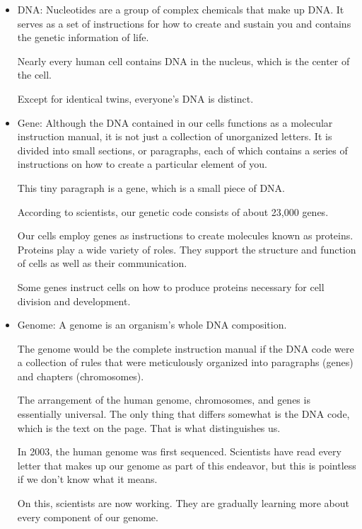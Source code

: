 \documentclass{article}
\begin{document}
\begin{itemize}
    \item DNA: Nucleotides are a group of complex chemicals that make up DNA. It serves as a set of instructions for how to create and sustain you and contains the genetic information of life. 

    Nearly every human cell contains DNA in the nucleus, which is the center of the cell. 
    
    Except for identical twins, everyone's DNA is distinct.
    \item  Gene: Although the DNA contained in our cells functions as a molecular instruction manual, it is not just a collection of unorganized letters. It is divided into small sections, or paragraphs, each of which contains a series of instructions on how to create a particular element of you. 

    This tiny paragraph is a gene, which is a small piece of DNA. 
    
    According to scientists, our genetic code consists of about 23,000 genes. 
    
    Our cells employ genes as instructions to create molecules known as proteins. Proteins play a wide variety of roles. They support the structure and function of cells as well as their communication. 
    
    Some genes instruct cells on how to produce proteins necessary for cell division and development.
    \item Genome: A genome is an organism's whole DNA composition. 

    The genome would be the complete instruction manual if the DNA code were a collection of rules that were meticulously organized into paragraphs (genes) and chapters (chromosomes). 
    
    The arrangement of the human genome, chromosomes, and genes is essentially universal. The only thing that differs somewhat is the DNA code, which is the text on the page. That is what distinguishes us. 
    
    In 2003, the human genome was first sequenced. Scientists have read every letter that makes up our genome as part of this endeavor, but this is pointless if we don't know what it means. 
    
    On this, scientists are now working. They are gradually learning more about every component of our genome.
\end{itemize}
\end{document}
